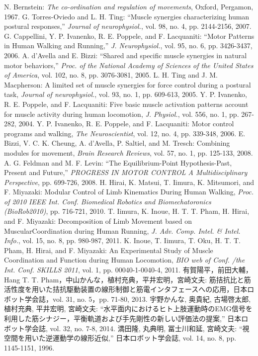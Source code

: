 \small
\begin{thebibliography}{99}
 N. Bernstein: {\it The co-ordination and regulation of movements}, Oxford, Pergamon, 1967.
 G. Torres-Oviedo and L. H. Ting: ``Muscle synergies characterizing human postural responses,'' {\it Journal of neurophysiol.}, vol. 98, no. 4, pp. 2144-2156, 2007.
 G. Cappellini, Y. P. Ivanenko, R. E. Poppele, and F. Lacquaniti: ``Motor Patterns in Human Walking and Running,'' {\it J. Neurophysiol.}, vol. 95, no. 6, pp. 3426-3437, 2006.
 A. d'Avella and E. Bizzi: ``Shared and specific muscle synergies in natural motor behaviors,'' {\it Proc. of the National Academy of Sciences of the United States of America}, vol. 102, no. 8, pp. 3076-3081, 2005.
 L. H. Ting and J. M. Macpherson: A limited set of muscle synergies for force control during a postural task, {\it Journal of neurophysiol.}, vol. 93, no. 1, pp. 609-613, 2005.
 Y. P. Ivanenko, R. E. Poppele, and F. Lacquaniti: Five basic muscle activation patterns account for muscle activity during human locomotion, {\it J. Physiol.}, vol. 556, no. 1, pp. 267-282, 2004.
 Y. P. Ivanenko, R. E. Poppele, and F. Lacquaniti: Motor control programs and walking, {\it The Neuroscientist}, vol. 12, no. 4, pp. 339-348, 2006.
 E. Bizzi, V. C. K. Cheung, A. d'Avella, P. Saltiel, and M. Tresch: Combining modules for movement, {\it Brain Research Reviews}, vol. 57, no. 1, pp. 125-133, 2008.
 A. G. Feldman and M. F. Levin: ``The Equilibrium-Point Hypothesis-Past, Present and Future,'' {\it PROGRESS IN MOTOR CONTROL A Multidisciplinary Perspective}, pp. 699-726, 2008.
 H. Hirai, K. Matsui, T. Iimura, K. Mitsumori, and F. Miyazaki: Modular Control of Limb Kinematics During Human Walking, {\it Proc. of 2010 IEEE Int. Conf. Biomedical Robotics and Biomechatoronics (BioRob2010)}, pp. 716-721, 2010.
 T. Iimura, K. Inoue, H. T. T. Pham, H. Hirai, and F. Miyazaki: Decomposition of Limb Movement based on MuscularCoordination during Human Running, {\it J. Adv. Comp. Intel. \& Intel. Info.}, vol. 15, no. 8, pp. 980-987, 2011.
 K. Inoue, T. Iimura, T. Oku, H. T. T. Pham, H. Hirai, and F. Miyazaki: An Experimental Study of Muscle Coordination and Function during Human Locomotion, {\it BIO web of Conf. /the Int. Conf. SKILLS 2011}, vol. 1, pp. 00040-1-0040-4, 2011.
 有賀陽平，前田大輔，Hang T. T. Pham，中山かんな，植村充典，平井宏明，宮崎文夫: 筋拮抗比と筋活性度を用いた拮抗駆動装置の線形制御と筋電インタフェースへの応用，日本ロボット学会誌，vol. 31, no. 5，pp. 71-80, 2013.
 宇野かんな, 奥貴紀, 古場啓太郎, 植村充典, 平井宏明, 宮崎文夫: ``水平面内におけるヒト上肢運動時のEMG信号を利用した筋シナジー，平衡軌道および手先剛性の新しい評価法の提案,'' 日本ロボット学会誌, vol. 32, no. 7-8, 2014.
 満田隆, 丸典明, 冨士川和延, 宮崎文夫: ``視空間を用いた逆運動学の線形近似,'' 日本ロボット学会誌, vol. 14, no. 8, pp. 1145-1151, 1996.


\end{thebibliography}

